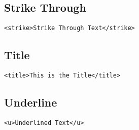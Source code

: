 \documentclass{article}
\begin{document}
\subsection{Strike Through}
\begin{lstlisting}
<strike>Strike Through Text</strike>
\end{lstlisting}

\subsection{Title}
\begin{lstlisting}
<title>This is the Title</title>
\end{lstlisting}

\subsection{Underline}
\begin{lstlisting}
<u>Underlined Text</u>
\end{lstlisting}

\end{document}
